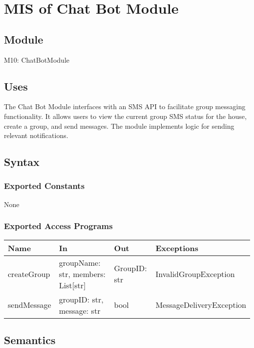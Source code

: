 \documentclass[12pt, titlepage]{article}
\begin{document}
\newpage
\section{MIS of Chat Bot Module} \label{Module}
 
\subsection{Module}

M10: ChatBotModule

\subsection{Uses}

The Chat Bot Module interfaces with an SMS API to facilitate group messaging functionality. It allows users to view the current group SMS status for the house, create a group, and send messages. The module implements logic for sending relevant notifications.

\subsection{Syntax}

\subsubsection{Exported Constants}
None

\subsubsection{Exported Access Programs}

\begin{center}
\begin{tabular}{p{3cm} p{5cm} p{3cm} p{5cm}}
\hline
\textbf{Name} & \textbf{In} & \textbf{Out} & \textbf{Exceptions} \\
\hline
createGroup & groupName: str, members: List[str] & GroupID: str & InvalidGroupException \\
\hline
sendMessage & groupID: str, message: str & bool & MessageDeliveryException \\
\hline
\end{tabular}
\end{center}

\subsection{Semantics}
\end{document}
